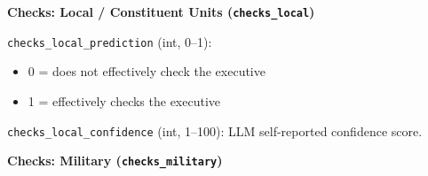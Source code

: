 \documentclass[11pt, a4paper]{article}
\newenvironment{promptquote}{%
  \begin{quote}\small
}{%
  \end{quote}
}
\begin{document}
\bigskip
\textbf{Checks: Local / Constituent Units (\texttt{checks\_local})}




\texttt{checks\_local\_prediction} (int, 0--1):
\begin{itemize}[nosep, leftmargin=1.7em]
  \item 0 = does not effectively check the executive
  \item 1 = effectively checks the executive
\end{itemize}
\texttt{checks\_local\_confidence} (int, 1--100): LLM self-reported confidence score.

\bigskip
\textbf{Checks: Military (\texttt{checks\_military})}



\end{document}
